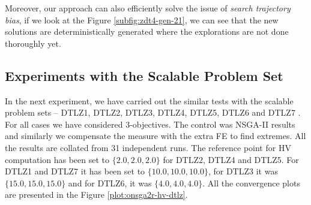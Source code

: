 \documentclass[journal]{IEEEtran}
\let\MYoriglatexcaption\caption
\renewcommand{\caption}[2][\relax]{\MYoriglatexcaption[#2]{#2}}
\begin{document}
Moreover, our approach can also efficiently solve the issue of \textit{search trajectory bias}, if we look at the Figure \ref{subfig:zdt4-gen-21}, we can see that the new solutions are deterministically generated where the explorations are not done thoroughly yet.

%
\begin{figure*}[tp!]
	\centering
	\hfill
	\hfill
	\caption{These plots illustrates the comparative analysis of the convergence rates for different 3-objective problems, the curves are actually consisted of box-plots. Here onsga2r denotes our algorithm and nsga2r is NSGA-II.}
	\label{plot:onsga2r-hv-dtlz}
\end{figure*}
%
\subsection{Experiments with the Scalable Problem Set}
\label{sec:onsga2r-dtlz}
In the next experiment, we have carried out the similar tests with the scalable problem sets -- DTLZ1, DTLZ2, DTLZ3, DTLZ4, DTLZ5, DTLZ6 and DTLZ7 \cite{dtlz-set}. For all cases we have considered \(3\)-objectives. The control was NSGA-II results and similarly we compensate the measure with the extra FE to find extremes. All the results are collated from 31 independent runs. The reference point for HV computation has been set to \(\{2.0, 2.0, 2.0\}\) for DTLZ2, DTLZ4 and DTLZ5. For DTLZ1 and DTLZ7 it has been set to \(\{10.0, 10.0, 10.0\}\), for DTLZ3 it was \(\{15.0, 15.0, 15.0\}\) and for DTLZ6, it was \(\{4.0, 4.0, 4.0\}\). All the convergence plots are presented in the Figure \ref{plot:onsga2r-hv-dtlz}. 
\end{document}
